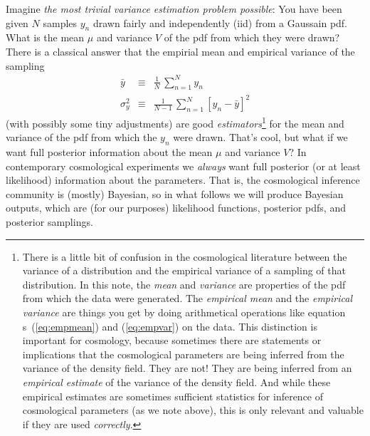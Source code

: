 \documentclass[12pt, letterpaper, preprint]{aastex}
\newcommand{\documentname}{note}
\newcommand{\equationname}{equation}
\begin{document}
Imagine \emph{the most trivial variance estimation problem possible}:
You have been given $N$ samples $y_n$ drawn fairly and independently (iid)
from a Gaussain pdf.
What is the mean $\mu$ and variance $V$ of the pdf from which they
were drawn?
There is a classical answer that the empirial mean and empirical
variance of the sampling
\begin{eqnarray}
\bar{y} &\equiv& \frac{1}{N}\,\sum_{n=1}^N y_n
\label{eq:empmean}\\
\sigma^2_y &\equiv& \frac{1}{N-1}\,\sum_{n=1}^N [y_n - \bar{y}]^2
\label{eq:empvar}
\end{eqnarray}
(with possibly some tiny adjustments) are good
\emph{estimators}\footnote{There is a little bit of confusion in the
  cosmological literature between the variance of a distribution and
  the empirical variance of a sampling of that distribution. In this
  \documentname, the \emph{mean} and \emph{variance} are properties of
  the pdf from which the data were generated. The \emph{empirical
    mean} and the \emph{empirical variance} are things you get by
  doing arithmetical operations like \equationname
  s~(\ref{eq:empmean}) and (\ref{eq:empvar}) on the data.  This
  distinction is important for cosmology, because sometimes there are
  statements or implications that the cosmological parameters are
  being inferred from the variance of the density field. They are not!
  They are being inferred from an \emph{empirical estimate} of the
  variance of the density field. And while these empirical estimates
  are sometimes sufficient statistics for inference of cosmological
  parameters (as we note above), this is only relevant and valuable if
  they are used \emph{correctly}.} for the mean and variance of the
pdf from which the $y_n$ were drawn.
That's cool, but what if we want full posterior information about the
mean $\mu$ and variance $V$?
In contemporary cosmological experiments we \emph{always} want full
posterior (or at least likelihood) information about the parameters.
That is, the cosmological inference community is (mostly) Bayesian,
so in what follows we will produce Bayesian outputs, which are (for
our purposes) likelihood functions, posterior pdfs, and posterior
samplings.
\end{document}
